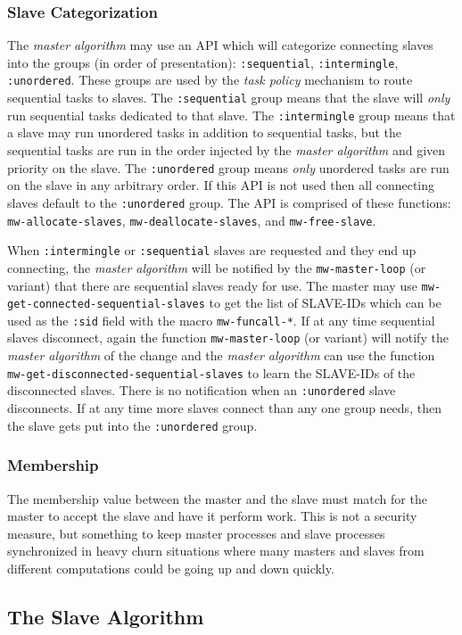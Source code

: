 \documentclass[titlepage,12pt]{book}
\newcommand{\xsmall}{\latexhtml{\small}{}}
\newcommand{\xnormalsize}{\latexhtml{\normalsize}{}}
\newcommand{\ma}{\textit{master algorithm}\xspace}
\newcommand{\tp}{\textit{task policy}\xspace}
\newcommand{\un}{\texttt{:unordered}\xspace}
\newcommand{\inter}{\texttt{:intermingle}\xspace}
\newcommand{\seq}{\texttt{:sequential}\xspace}
\newcommand{\func}[1]{\xsmall\mbox{\uppercase{\texttt{#1}}}\xnormalsize\xspace}
\newcommand{\macro}[1]{\xsmall\mbox{\uppercase{\texttt{#1}}}\xnormalsize\xspace}
\begin{document}
\subsubsection{Slave Categorization}

The \ma may use an API which will categorize connecting slaves into
the groups (in order of presentation): \seq, \inter, \un. These groups
are used by the \tp mechanism to route sequential tasks to slaves.
The \seq group means that the slave will \emph{only} run sequential
tasks dedicated to that slave. The \inter group means that a slave
may run unordered tasks in addition to sequential tasks, but the
sequential tasks are run in the order injected by the \ma and given
priority on the slave. The \un group means \emph{only} unordered
tasks are run on the slave in any arbitrary order. If this API is not
used then all connecting slaves default to the \un group. The API 
is comprised of these functions: \func{mw-allocate-slaves},
\func{mw-deallocate-slaves}, and \func{mw-free-slave}.

When \inter or \seq slaves are requested and they end up connecting,
the \ma will be notified by the \func{mw-master-loop} (or variant)
that there are sequential slaves ready for use. The master may
use \func{mw-get-connected-sequential-slaves} to get the list
of SLAVE-IDs which can be used as the \texttt{:sid} field with
the macro \macro{mw-funcall-*}. If at any time sequential slaves
disconnect, again the function \func{mw-master-loop} (or variant)
will notify the \ma of the change and the \ma can use the function
\func{mw-get-disconnected-sequential-slaves} to learn the SLAVE-IDs
of the disconnected slaves. There is no notification when an \un
slave disconnects. If at any time more slaves connect than any one
group needs, then the slave gets put into the \un group.

\subsubsection{Membership}

The membership value between the master and the slave must match for
the master to accept the slave and have it perform work. This is not
a security measure, but something to keep master processes and slave
processes synchronized in heavy churn situations where many masters and
slaves from different computations could be going up and down quickly.

\subsection{The Slave Algorithm}
\end{document}
